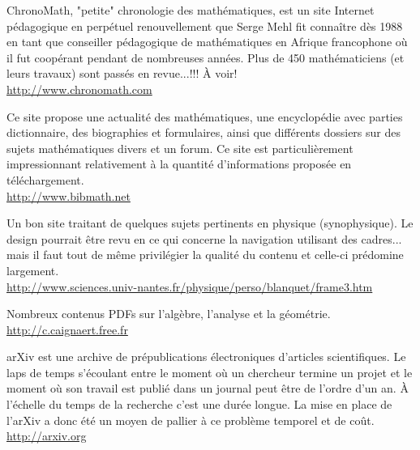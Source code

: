 	{\Large {}}{\Large {}}{\Large {}}{\Large {}}{\Large {}}{\Large {}}\bcdfrance{} ChronoMath, "petite" chronologie des mathématiques, est un site Internet pédagogique en perpétuel renouvellement que Serge Mehl fit connaître dès 1988 en tant que conseiller pédagogique de mathématiques en Afrique francophone où il fut coopérant pendant de nombreuses années. Plus de 450 mathématiciens (et leurs travaux) sont passés en revue...!!! À voir!\\
	\href{http://www.chronomath.com}{\color{blue} http://www.chronomath.com}
	
	{\Large {}}{\Large {}}{\Large {}}\bcdfrance{} Ce site propose une actualité des mathématiques, une encyclopédie avec parties dictionnaire, des biographies et formulaires, ainsi que différents dossiers sur des sujets mathématiques divers et un forum. Ce site est particulièrement impressionnant relativement à la quantité d'informations proposée en téléchargement. \\
	\href{http://www.bibmath.net}{\color{blue} http://www.bibmath.net} 
	
	{\Large {}}{\Large {}}\bcdfrance{} Un bon site traitant de quelques sujets pertinents en physique (synophysique). Le design pourrait être revu en ce qui concerne la navigation utilisant des cadres... mais il faut tout de même privilégier la qualité du contenu et celle-ci prédomine largement.\\
	\href{http://www.sciences.univ-nantes.fr/physique/perso/blanquet/frame3.htm}{\color{blue} http://www.sciences.univ-nantes.fr/physique/perso/blanquet/frame3.htm}
	
	{\Large {}}{\Large {}}{\Large {}}\bcdfrance{} Nombreux contenus PDFs sur l'algèbre, l'analyse et la géométrie.\\
	\href{http://c.caignaert.free.fr}{\color{blue} http://c.caignaert.free.fr}
	
	{\Large {}}{\Large {}}{\Large {}} arXiv est une archive de prépublications électroniques d'articles scientifiques. Le laps de temps s'écoulant entre le moment où un chercheur termine un projet et le moment où son travail est publié dans un journal peut être de l'ordre d'un an. À l'échelle du temps de la recherche c'est une durée longue. La mise en place de l'arXiv a donc été un moyen de pallier à ce problème temporel et de coût.\\
	\href{http://arxiv.org}{\color{blue} http://arxiv.org}
	
